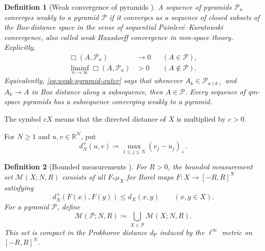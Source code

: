 \documentclass[10pt,a4paper]{amsart}
\numberwithin{equation}{section}
\newtheorem*{definition*}{Definition}
\newcommand{\R}{\mathbb R}
\begin{document}
\begin{definition*}[Weak convergence of pyramids {\cite[Definition~A.3, Theorem~5.1, and Corollary~5.3]{gds3-ja}}]
A sequence of pyramids $\mathcal P_n$ \emph{converges weakly} to a pyramid $\mathcal P$ if it converges as a sequence of closed subsets of the Box-distance space in the sense of sequential Painlev\'e--Kuratowski convergence, also called weak Hausdorff convergence in mm-space theory.  Explicitly,
\begin{align}
\Box(A,\mathcal P_n)&\longrightarrow0 &&(A\in\mathcal P), \label{eq:weak-pyramid-inner}\\
\liminf_{n\to\infty}\Box(A,\mathcal P_n)&>0 &&(A\notin\mathcal P). \label{eq:weak-pyramid-outer}
\end{align}
Equivalently, \eqref{eq:weak-pyramid-outer} says that whenever $A_k\in\mathcal P_{n(k)}$ and $A_k\to A$ in Box distance along a subsequence, then $A\in\mathcal P$.  Every sequence of qm-space pyramids has a subsequence converging weakly to a pyramid.
\end{definition*}

The symbol $cX$ means that the directed distance of $X$ is multiplied by $c>0$.

For $N\ge1$ and $u,v\in\R^N$, put
\begin{equation}\label{eq:directed-cube-distance} d_N^+(u,v)\coloneqq\max_{1\le j\le N}(v_j-u_j)_+. \end{equation}
\begin{definition*}[Bounded measurements {\cite[Definition~4.1]{gds3-ja}}]
For $R>0$, the \emph{bounded measurement set} $\mathcal M(X;N,R)$ consists of all $F_*\mu_X$ for Borel maps $F\colon X\to[-R,R]^N$ satisfying
\begin{equation}\label{eq:bounded-measurement-condition} d_N^+(F(x),F(y))\le d_X(x,y) \qquad(x,y\in X). \end{equation}
For a pyramid $\mathcal P$, define
\begin{equation}\label{eq:pyramid-bounded-measurement} \mathcal M(\mathcal P;N,R)\coloneqq\bigcup_{X\in\mathcal P}\mathcal M(X;N,R). \end{equation}
This set is compact in the Prokhorov distance $d_{\mathrm P}$ induced by the $\ell^\infty$ metric on $[-R,R]^N$.
\end{definition*}
\end{document}
